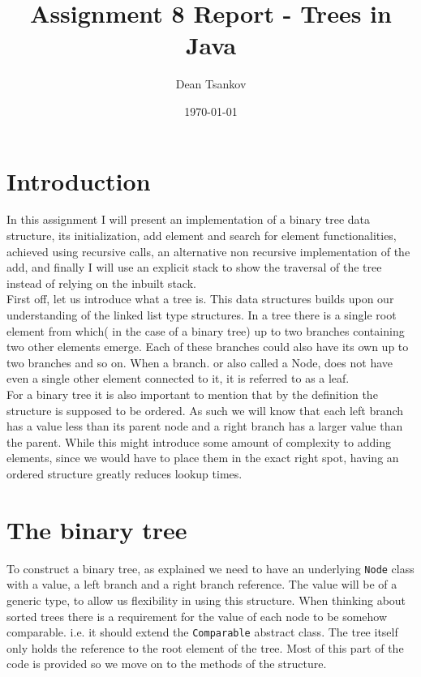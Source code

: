 \documentclass[a4paper,11pt]{article}
\begin{document}
\title{
    \textbf{Assignment 8 Report - Trees in Java}
}
\author{Dean Tsankov}
\date{\today}

\maketitle

\section*{Introduction}

In this assignment I will present an implementation of a binary tree data structure, its initialization, add element and search for element functionalities, achieved using recursive calls, an alternative non recursive implementation of the add, and finally I will use an explicit stack to show the traversal of the tree instead of relying on the inbuilt stack. 
\\

First off, let us introduce what a tree is. This data structures builds upon our understanding of the linked list type structures. In a tree there is a single root element from which( in the case of a binary tree) up to two branches containing two other elements emerge. Each of these branches could also have its own up to two branches and so on. When a branch. or also called a Node, does not have even a single other element connected to it, it is referred to as a leaf. 
\\

For a binary tree it is also important to mention that by the definition the structure is supposed to be ordered. As such we will know that each left branch has a value less than its parent node and a right branch has a larger value than the parent. While this might introduce some amount of complexity to adding elements, since we would have to place them in the exact right spot, having an ordered structure greatly reduces lookup times.

\section*{The binary tree}

To construct a binary tree, as explained we need to have an underlying {\tt Node} class with a value, a left
branch and a right branch reference. The value will be of a generic type, to allow us flexibility in using this structure.
When thinking about sorted trees there is a requirement for the value of each node to be somehow comparable. i.e. it should extend the {\tt Comparable} abstract class. The tree itself only holds the reference to the root element of the tree. Most of this part of the code is provided so we move on to the methods of the structure.
\end{document}
